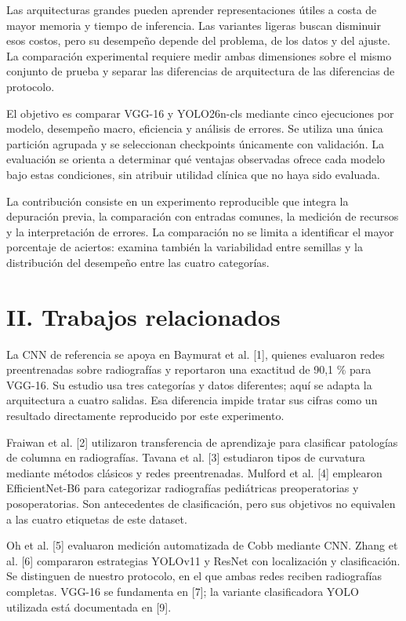 \documentclass[conference]{IEEEtran}
\begin{document}
\newpage
Las arquitecturas grandes pueden aprender representaciones útiles a costa de mayor memoria y tiempo de inferencia. Las variantes ligeras buscan disminuir esos costos, pero su desempeño depende del problema, de los datos y del ajuste. La comparación experimental requiere medir ambas dimensiones sobre el mismo conjunto de prueba y separar las diferencias de arquitectura de las diferencias de protocolo.

El objetivo es comparar VGG-16 y YOLO26n-cls mediante cinco ejecuciones por modelo, desempeño macro, eficiencia y análisis de errores. Se utiliza una única partición agrupada y se seleccionan checkpoints únicamente con validación. La evaluación se orienta a determinar qué ventajas observadas ofrece cada modelo bajo estas condiciones, sin atribuir utilidad clínica que no haya sido evaluada.

La contribución consiste en un experimento reproducible que integra la depuración previa, la comparación con entradas comunes, la medición de recursos y la interpretación de errores. La comparación no se limita a identificar el mayor porcentaje de aciertos: examina también la variabilidad entre semillas y la distribución del desempeño entre las cuatro categorías.

\section*{II. Trabajos relacionados}
La CNN de referencia se apoya en Baymurat et al. [1], quienes evaluaron redes preentrenadas sobre radiografías y reportaron una exactitud de 90,1 \% para VGG-16. Su estudio usa tres categorías y datos diferentes; aquí se adapta la arquitectura a cuatro salidas. Esa diferencia impide tratar sus cifras como un resultado directamente reproducido por este experimento.

Fraiwan et al. [2] utilizaron transferencia de aprendizaje para clasificar patologías de columna en radiografías. Tavana et al. [3] estudiaron tipos de curvatura mediante métodos clásicos y redes preentrenadas. Mulford et al. [4] emplearon EfficientNet-B6 para categorizar radiografías pediátricas preoperatorias y posoperatorias. Son antecedentes de clasificación, pero sus objetivos no equivalen a las cuatro etiquetas de este dataset.

Oh et al. [5] evaluaron medición automatizada de Cobb mediante CNN. Zhang et al. [6] compararon estrategias YOLOv11 y ResNet con localización y clasificación. Se distinguen de nuestro protocolo, en el que ambas redes reciben radiografías completas. VGG-16 se fundamenta en [7]; la variante clasificadora YOLO utilizada está documentada en [9].
\end{document}
